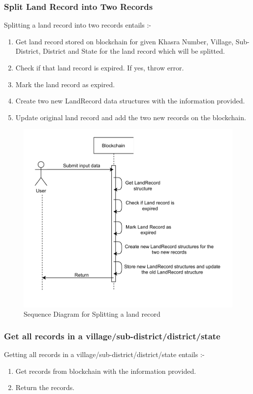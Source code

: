\documentclass{article}
\begin{document}
    \subsubsection{Split Land Record into Two Records}
        Splitting a land record into two records entails :-
        \begin{enumerate}
            \item Get land record stored on blockchain for given Khasra Number, Village, Sub-District, District and State for the land record which will be splitted.
            \item Check if that land record is expired. If yes, throw error.
            \item Mark the land record as expired.
            \item Create two new LandRecord data structures with the information provided.
            \item Update original land record and add the two new records on the blockchain. 
        \end{enumerate}

        \begin{figure}[htbp]
            \includegraphics[scale=0.25]{blockchain_seq_split_land}
            \centering
            \caption{Sequence Diagram for Splitting a land record}
        \end{figure}
        
    \subsubsection{Get all records in a village/sub-district/district/state}
        Getting all records in a village/sub-district/district/state entails :-
        \begin{enumerate}
            \item Get records from blockchain with the information provided.
            \item Return the records.
        \end{enumerate}
\end{document}
